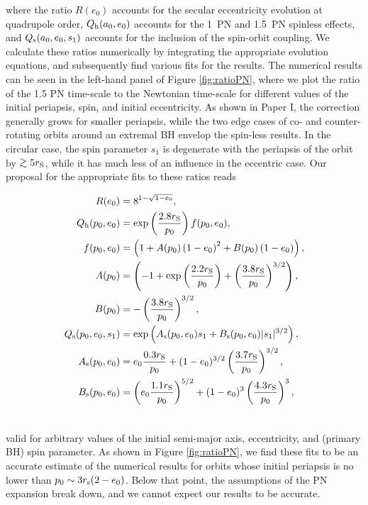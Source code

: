 \documentclass[usenatbib]{mnras}
\def\gsim{\mathrel{\rlap{\lower 3pt \hbox{$\sim$}} \raise 2.0pt \hbox{$>$}}}
\begin{document}
\noindent where the ratio $R(e_0)$ accounts for the secular eccentricity evolution at quadrupole order, $Q_{\rm h}(a_0,e_0)$ accounts for the 1~PN and 1.5~PN spinless effects, and $Q_{\rm s}(a_0,e_0,s_1)$ accounts for the inclusion of the spin-orbit coupling. We calculate these ratios numerically by integrating the appropriate evolution equations, and subsequently find various fits for the results. The numerical results can be seen in the left-hand panel of Figure \ref{fig:ratioPN}, where we plot the ratio of the 1.5 PN time-scale to the Newtonian time-scale for different values of the initial periapsis, spin, and initial eccentricity. As shown in Paper I, the correction generally grows for smaller periapsis, while the two edge cases of co- and counter-rotating orbits around an extremal BH envelop the spin-less results. In the circular case, the spin parameter $s_1$ is degenerate with the periapsis of the orbit by $\gsim 5 r_{\rm S}$, while it has much less of an influence in the eccentric case. Our proposal for the appropriate fits to these ratios reads

\begin{align}
R(e_0) &= 8^{1- \sqrt{1-e_0}}, \label{eq:r1} \\
Q_{\rm h}(p_0,e_0) &= \exp \left(\frac{2.8 r_{\rm S}}{p_0} \right) f(p_0,e_0), \\
f(p_0,e_0)&=\left( 1 +  A(p_0)\left( 1 - e_0 \right)^2 + B(p_0)\left( 1 - e_0 \right) \right), \nonumber \\
A(p_0)&= \left( -1 + \exp \left(\frac{2.2 r_{\rm S}}{p_0} \right) + \left( \frac{3.8 r_{\rm S}}{p_0} \right)^{3/2} \right), \nonumber \\
B(p_0)&= - \left( \frac{3.8 r_{\rm S}}{p_0} \right)^{3/2}, \nonumber \\
Q_{\rm s}(p_0,e_0,s_1) &= \exp \left( A_{\rm s}(p_0,e_0) s_1  + B_{\rm s}(p_0,e_0)\lvert s_1 \rvert ^{3/2} \right), \label{eq:r2}\\
A_{\rm s}(p_0,e_0) &= e_0 \frac{0.3 r_{\rm S}}{p_0} + (1-e_0)^{3/2} \left( \frac{3.7 r_{\rm S}}{p_0}\right) ^{3/2}, \nonumber \\
B_{\rm s}(p_0,e_0) &= \left( e_0 \frac{1.1 r_{\rm S}}{p_0} \right)^{5/2} + (1-e_0)^{3} \left( \frac{4.3 r_{\rm S}}{p_0}\right) ^{3}, \nonumber \\ \nonumber
\end{align}

\noindent valid for arbitrary values of the initial semi-major axis, eccentricity, and (primary BH) spin parameter. As shown in Figure \ref{fig:ratioPN}, we find these fits to be an accurate estimate of the numerical results for orbits whose initial periapsis is no lower than $p_{0} \sim 3r_{\rm s} (2 -e_0)$. Below that point, the assumptions of the PN expansion break down, and we cannot expect our results to be accurate.
\end{document}
